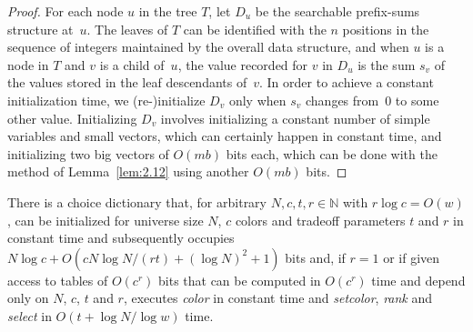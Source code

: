 \documentclass[envcountsame,envcountsect,undated,nolinenumbers]{lnthi}
\def\Tvn#1{\hbox{\textit{#1\/}}}
\def\TbbbN{\mathbb{N}}
\begin{document}
\begin{proof}
For each node $u$ in the tree $T$, let $D_u$ be the
searchable prefix-sums structure at~$u$.
The leaves of $T$ can be identified with
the $n$ positions in the sequence of integers
maintained by the overall data structure, and when
$u$ is a node in $T$ and $v$ is a child of~$u$,
the value recorded for $v$ in $D_u$
is the sum $s_v$ of the values stored in the leaf
descendants of~$v$.
In order to achieve a constant initialization
time, we (re-)initialize $D_v$ only when $s_v$
changes from~0 to some other value.
Initializing $D_v$ involves initializing a
constant number of simple variables and
small vectors, which can certainly happen in
constant time, and initializing two big vectors
of $O(m b)$ bits each, which can be done
with the method of
Lemma~\ref{lem:2.12} using another $O(m b)$ bits.
\end{proof}

\begin{lemma}
\label{lem:p-t}There is a choice dictionary that, for arbitrary
$N,c,t,r\in\TbbbN$ with $r\log c=O(w)$,
can be initialized for universe
size $N$, $c$ colors and tradeoff parameters $t$ and $r$
in constant time
and subsequently occupies
$N\log c+O({{c N\log N}/{(r t)}}+(\log N)^2+1)$ bits and,
if $r=1$ or if given access to tables of $O(c^r)$ bits
that can be computed in $O(c^r)$ time
and depend only on $N$, $c$, $t$ and $r$, executes
\Tvn{color} in constant time and \Tvn{setcolor}, 
\Tvn{rank} and \Tvn{select}
in $O(t+{{\log N}/{\log w}})$ time.
\end{lemma}
\end{document}
